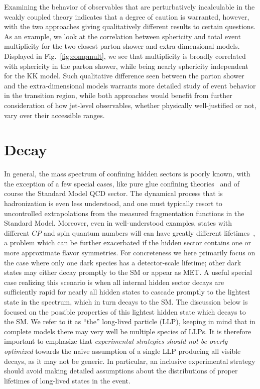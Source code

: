 Examining the behavior of observables that are perturbatively incalculable in the weakly coupled theory indicates that a degree of caution is warranted, however, with the two approaches giving qualitatively different results to certain questions. As an example, we look at the correlation between sphericity and total event multiplicity for the two closest parton shower and extra-dimensional models. Displayed in Fig.~\ref{fig:compmult}, we see that multiplicity is broadly correlated with sphericity in the parton shower, while being nearly sphericity independent for the KK model. Such qualitative difference seen between the parton shower and the extra-dimensional models warrants more detailed study of event behavior in the transition region, while both approaches would benefit from further consideration of how jet-level observables, whether physically well-justified or not, vary over their accessible ranges.

\section{Decay}
\label{sec:darkshowerdk}

In general, the mass spectrum of confining hidden sectors is poorly known, with the exception of a few special cases, like pure glue confining theories~\cite{Morningstar:1999rf} and of course the Standard Model QCD sector. The dynamical process that is hadronization is even less understood, and one must typically resort to uncontrolled extrapolations from the measured fragmentation functions in the Standard Model. Moreover, even in well-understood examples,  states with different $CP$ and spin  quantum numbers will can have greatly different lifetimes~\cite{Strassler:2006im,Juknevich:2009ji,Juknevich:2009gg}, a problem which can be further exacerbated if the hidden sector contains one or more approximate flavor symmetries. For concreteness we here primarily focus on the case where only one dark species has a detector-scale lifetime; other dark states may either  decay promptly to the SM or appear as MET.
A useful special case realizing this scenario is when all internal hidden sector decays are sufficiently rapid for nearly all hidden states to cascade promptly to the lightest state in the spectrum, which in turn decays to the SM. The discussion below is focused on the possible properties of this lightest hidden state which decays to the SM. We refer to it as ``the'' long-lived particle (LLP), keeping in mind that in complete models there may very well be multiple species of LLPs. It is therefore important to emphasize that \emph{experimental strategies should not be overly optimized} towards the naive assumption of a single LLP producing all visible decays, as it may not be generic. In particular, an inclusive experimental strategy should avoid making detailed assumptions about the distributions of proper lifetimes of long-lived states in the event.



